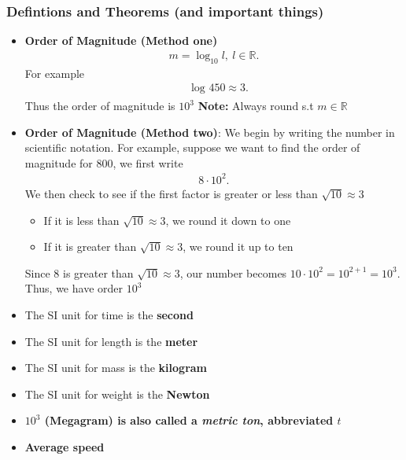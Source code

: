 \documentclass{report}
\begin{document}
    \pagebreak 
    \subsubsection{Defintions and Theorems (and important things)}
    \begin{itemize}
        \item \textbf{Order of Magnitude (Method one)}
            \begin{align*}
                m = \log_{10}{l},\ l \in \mathbb{R}
            .\end{align*}
            For example
            \begin{align*}
                &\log_{}{450} \approx 3
            .\end{align*}
            Thus the order of magnitude is $10^{3}$
            \bigbreak \noindent 
            \textbf{Note:} Always round s.t $m \in \mathbb{R}$ 
        \item \textbf{Order of Magnitude (Method two)}: We begin by writing the number in scientific notation. For example, suppose we want to find the order of magnitude for $800$, we first write 
            \begin{align*}
                8 \cdot 10^{2}
            .\end{align*}
            We then check to see if the first factor is greater or less than $\sqrt{10} \approx 3$
            \begin{itemize}
                \item If it is less than $\sqrt{10} \approx  3$, we round it down to one
                \item If it is greater than $\sqrt{10} \approx  3$, we round it up to ten
            \end{itemize}
            Since 8 is greater than $\sqrt{10} \approx  3$, our number becomes $10 \cdot 10^{2} = 10^{2+1} = 10^{3}$. Thus, we have order $10^{3}$
        \item The SI unit for time is the \textbf{second}
        \item The SI unit for length is the \textbf{meter}
        \item The SI unit for mass is the \textbf{kilogram}
        \item The SI unit for weight is the \textbf{Newton}
        \item \textbf{$10^{3}$ (Megagram) is also called a \textit{metric ton}, abbreviated $t$}
        \item \textbf{Average speed}
            \begin{align*}

\end{align*}
\end{itemize}
\end{document}
